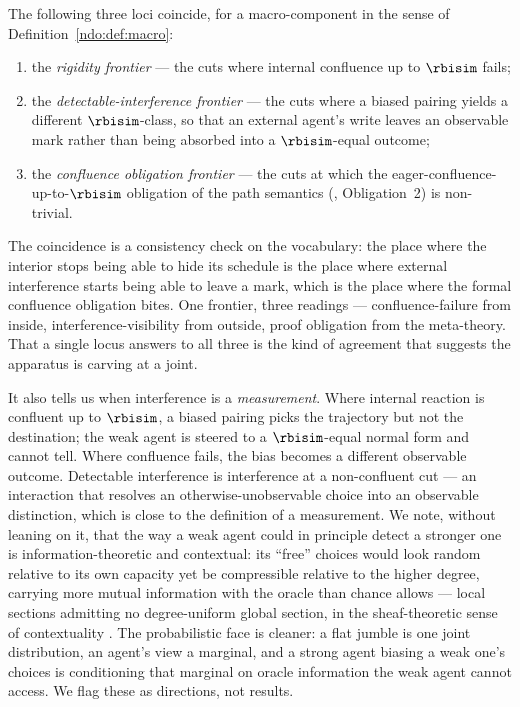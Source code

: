 \begin{proposition}\label{ndo:prop:frontier}
The following three loci coincide, for a macro-component in the sense of
Definition~\ref{ndo:def:macro}:
\begin{enumerate}[label=(\roman*),leftmargin=2.2em]
\item the \emph{rigidity frontier} --- the cuts where internal confluence up to
$\rbisim$ fails;
\item the \emph{detectable-interference frontier} --- the cuts where a biased
pairing yields a different $\rbisim$-class, so that an external agent's write
leaves an observable mark rather than being absorbed into a $\rbisim$-equal
outcome;
\item the \emph{confluence obligation frontier} --- the cuts at which the
eager-confluence-up-to-$\rbisim$ obligation of the path semantics
(\cite{paths}, Obligation~2) is non-trivial.
\end{enumerate}
\end{proposition}

\noindent
The coincidence is a consistency check on the vocabulary: the place where the
interior stops being able to hide its schedule is the place where external
interference starts being able to leave a mark, which is the place where the
formal confluence obligation bites. One frontier, three readings ---
confluence-failure from inside, interference-visibility from outside, proof
obligation from the meta-theory. That a single locus answers to all three is the
kind of agreement that suggests the apparatus is carving at a joint.

It also tells us when interference is a \emph{measurement}. Where internal reaction
is confluent up to $\rbisim$, a biased pairing picks the trajectory but not the
destination; the weak agent is steered to a $\rbisim$-equal normal form and cannot
tell. Where confluence fails, the bias becomes a different observable outcome.
Detectable interference is interference at a non-confluent cut --- an interaction
that resolves an otherwise-unobservable choice into an observable distinction,
which is close to the definition of a measurement. We note, without leaning on it,
that the way a weak agent could in principle detect a stronger one is
information-theoretic and contextual: its ``free'' choices would look random
relative to its own capacity yet be compressible relative to the higher degree,
carrying more mutual information with the oracle than chance allows --- local
sections admitting no degree-uniform global section, in the
sheaf-theoretic sense of contextuality \cite{abramsky}. The probabilistic face is
cleaner: a flat jumble is one joint distribution, an agent's view a marginal, and a
strong agent biasing a weak one's choices is conditioning that marginal on oracle
information the weak agent cannot access. We flag these as directions, not results.


